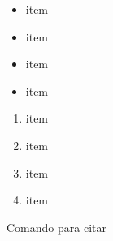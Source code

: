 \documentclass{article}
\begin{document}
\begin{multicols}{2}
\begin{itemize}
	\item item
	\item item
	\item item
	\item item
\end{itemize}

\begin{enumerate}
    \item item 
    \item item
    \item item
    \item item
\end{enumerate}


Comando para citar  \cite{Agarwal2019}

\end{multicols}
\end{document}
